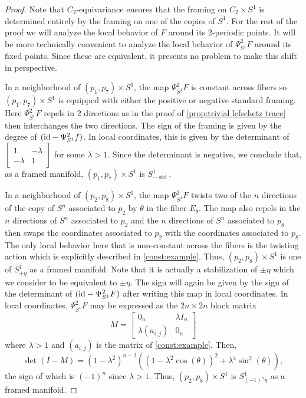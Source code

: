 \documentclass[11pt]{amsart}
\newcommand{\id}{\textup{id}}
\DeclareMathOperator{\std}{std}
\theoremstyle{plain}   %
\theoremstyle{definition}
\theoremstyle{remark}
\numberwithin{equation}{section}
\begin{document}
\begin{proof}
Note that $C_2$-equivariance ensures that the framing on $C_2\times S^1$ is determined entirely by the framing on one of the copies of $S^1$. For the rest of the proof we will analyze the local behavior of $F$ around its 2-periodic points. It will be more technically convenient to analyze the local behavior of $\Psi^{2}_{S^1} F$ around its fixed points. Since these are equivalent, it presents no problem to make this shift in perspective.  

In a neighborhood of $(p_1,p_7)\times S^1$, the map $\Psi_{S^1}^{2}F$ is constant across fibers so $(p_1,p_7)\times S^1$ is equipped with either the positive or negative standard framing. Here $\Psi_{S^1}^2F$ repels in 2 directions as in the proof of \cref{prop:trivial lefschetz trace} then interchanges the two directions. The sign of the framing is given by the degree of $(\id-\Psi_{S^1}^2 f)$. In local coordinates, this is given by the determinant of $\begin{bmatrix}
1&-\lambda\\-\lambda&1\end{bmatrix}$ for some $\lambda>1$. Since the determinant is negative, we conclude that, as a framed manifold, $(p_1,p_7)\times S^1$ is $S^1_{-\std}$. 

In a neighborhood of $(p_2,p_8)\times S^1$, the map $\Psi_{S^1}^{2} F$ twists two of the $n$ directions of the copy of $S^n$ associated to $p_2$ by $\theta$ in the fiber $E_\theta$. The map also repels in the $n$ directions of $S^n$ associated to $p_2$ and the $n$ directions of $S^n$ associated to $p_8$ then swaps the coordinates associated to $p_2$ with the coordinates associated to $p_8$. The only local behavior here that is non-constant across the fibers is the twisting action which is explicitly described in \cref{const:example}. Thus, $(p_2,p_8)\times S^1$ is one of $S^1_{\pm \eta}$ as a framed manifold. Note that it is actually a stabilization of $\pm\eta$ which we consider to be equivalent to $\pm\eta$. The sign will again be given by the sign of the determinant of $(\id-\Psi_{S^1}^2F)$ after writing this map in local coordinates. In local coordinates, $\Psi_{S^1}^2F$ may be expressed as the $2n\times 2n$ block matrix 
\[
M=\left[\begin{array}{c|c}
0_n&\lambda I_n\\ \hline
\lambda(a_{i,j}) & 0_n
\end{array}\right]
\]
where $\lambda>1$ and $(a_{i,j})$ is the matrix of \cref{const:example}. Then,
\[
\det(I-M)=(1-\lambda^2)^{n-2} ((1-\lambda^2\cos(\theta))^2+\lambda^4\sin^2(\theta)),
\] 
the sign of which is $(-1)^n$ since $\lambda>1$. Thus, $(p_2,p_8)\times S^1$ is $S^1_{(-1)^{n}\eta}$ as a framed manifold.


\end{proof}
\end{document}
